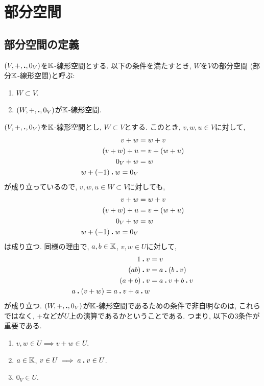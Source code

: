 \chapter{部分空間}
\section{部分空間の定義}
\begin{definition}
  $(V,+,\mathbin{\boldsymbol{.}},0_V)$を$\mathbb{K}$-線形空間とする.
  以下の条件を満たすとき,
  $W$を$V$の部分空間 (部分$\mathbb{K}$-線形空間)と呼ぶ:
  \begin{enumerate}
  \item $W\subset V$.
  \item $(W,+,\mathbin{\boldsymbol{.}},0_V)$が$\mathbb{K}$-線形空間.
  \end{enumerate}
\end{definition}
\begin{remark}
  $(V,+,\mathbin{\boldsymbol{.}},0_V)$を$\mathbb{K}$-線形空間とし, $W\subset V$とする.
このとき, $v,w,u\in V$に対して,
\begin{align*}
  v+w&=w+v\\
  (v+w)+u&=v+(w+u)\\
  0_V+w&=w\\
  w+(-1)\mathbin{\boldsymbol{.}} w=0_V
\end{align*}
が成り立っているので,
$v,w,u\in W\subset V$に対しても,
\begin{align*}
  v+w&=w+v\\
  (v+w)+u&=v+(w+u)\\
  0_V+w&=w\\
  w+(-1)\mathbin{\boldsymbol{.}} w=0_V
\end{align*}
は成り立つ.
同様の理由で,
$a,b\in \mathbb{K}$, $v,w\in U$に対して,
\begin{align*}
  1\mathbin{\boldsymbol{.}} v&=v\\
  (ab)\mathbin{\boldsymbol{.}} v&=a\mathbin{\boldsymbol{.}}(b\mathbin{\boldsymbol{.}} v)\\
  (a+b)\mathbin{\boldsymbol{.}} v&=a\mathbin{\boldsymbol{.}} v+b\mathbin{\boldsymbol{.}} v\\
  a\mathbin{\boldsymbol{.}}(v+w)=a\mathbin{\boldsymbol{.}} v+a\mathbin{\boldsymbol{.}} w
\end{align*}
が成り立つ.
$(W,+,\mathbin{\boldsymbol{.}},0_V)$が$\mathbb{K}$-線形空間であるための条件で非自明なのは,
これらではなく, $+$などが$U$上の演算であるかということである.
つまり, 以下の$3$条件が重要である.
\begin{enumerate}
  \item $v,w\in U \implies v+w\in U$.
  \item $a\in\mathbb{K}$, $v\in U \implies a\mathbin{\boldsymbol{.}} v\in U$.
  \item $0_V\in U$.
\end{enumerate}
\end{remark}
